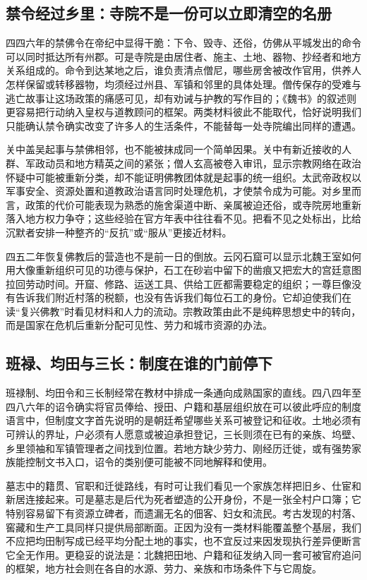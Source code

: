 \subsection{禁令经过乡里：寺院不是一份可以立即清空的名册}

四四六年的禁佛令在帝纪中显得干脆：下令、毁寺、还俗，仿佛从平城发出的命令可以同时抵达所有州郡。可是寺院是由居住者、施主、土地、器物、抄经者和地方关系组成的。命令到达某地之后，谁负责清点僧尼，哪些房舍被改作官用，供养人怎样保留或转移器物，均须经过州县、军镇和邻里的具体处理。僧传保存的受难与逃亡故事让这场政策的痛感可见，却有劝诫与护教的写作目的；《魏书》的叙述则更容易把行动纳入皇权与道教顾问的框架。两类材料彼此不能取代，恰好说明我们只能确认禁令确实改变了许多人的生活条件，不能替每一处寺院编出同样的遭遇。

关中盖吴起事与禁佛相邻，也不能被抹成同一个简单因果。关中有新近接收的人群、军政动员和地方精英之间的紧张；僧人玄高被卷入审讯，显示宗教网络在政治怀疑中可能被重新分类，却不能证明佛教团体就是起事的统一组织。太武帝政权以军事安全、资源处置和道教政治语言同时处理危机，才使禁令成为可能。对乡里而言，政策的代价可能表现为熟悉的施舍渠道中断、亲属被迫还俗，或寺院房地重新落入地方权力争夺；这些经验在官方年表中往往看不见。把看不见之处标出，比给沉默者安排一种整齐的“反抗”或“服从”更接近材料。

四五二年恢复佛教后的营造也不是前一日的倒放。云冈石窟可以显示北魏王室如何用大像重新组织可见的功德与保护，石工在砂岩中留下的凿痕又把宏大的宫廷意图拉回劳动时间。开窟、修路、运送工具、供给工匠都需要稳定的组织；一尊巨像没有告诉我们附近村落的税额，也没有告诉我们每位石工的身份。它却迫使我们在读“复兴佛教”时看见材料和人力的流动。宗教政策由此不是纯粹思想史中的转向，而是国家在危机后重新分配可见性、劳力和城市资源的办法。

\subsection{班禄、均田与三长：制度在谁的门前停下}

班禄制、均田令和三长制经常在教材中排成一条通向成熟国家的直线。四八四年至四八六年的诏令确实将官员俸给、授田、户籍和基层组织放在可以彼此呼应的制度语言中，但制度文字首先说明的是朝廷希望哪些关系可被登记和征收。土地必须有可辨认的界址，户必须有人愿意或被迫承担登记，三长则须在已有的亲族、坞壁、乡里领袖和军镇管理者之间找到位置。若地方缺少劳力、刚经历迁徙，或有强势家族能控制文书入口，诏令的类别便可能被不同地解释和使用。

墓志中的籍贯、官职和迁徙路线，有时可让我们看见一个家族怎样把旧乡、仕宦和新居连接起来。可是墓志是后代为死者塑造的公开身份，不是一张全村户口簿；它特别容易留下有资源立碑者，而遗漏无名的佃客、妇女和流民。考古发现的村落、窖藏和生产工具同样只提供局部断面。正因为没有一类材料能覆盖整个基层，我们不应把均田制写成已经平均分配土地的事实，也不宜反过来因发现执行差异便断言它全无作用。更稳妥的说法是：北魏把田地、户籍和征发纳入同一套可被官府追问的框架，地方社会则在各自的水源、劳力、亲族和市场条件下与它周旋。

